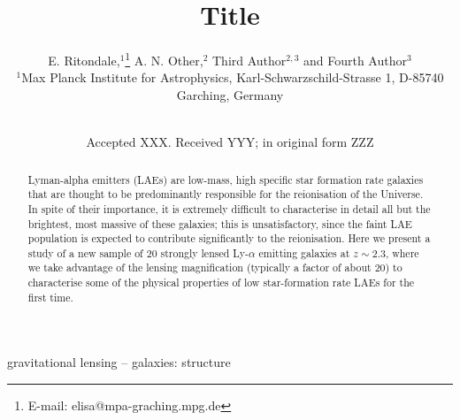 \documentclass[a4paper,fleqn,usenatbib]{mnras}
\title[Short title]{Title}
\author[E. Ritondale et al.]{
E. Ritondale,$^{1}$\thanks{E-mail: elisa@mpa-graching.mpg.de}
A. N. Other,$^{2}$
Third Author$^{2,3}$
and Fourth Author$^{3}$
\\
$^{1}$Max Planck Institute for Astrophysics, Karl-Schwarzschild-Strasse 1, D-85740 Garching, Germany\\\\
}
\date{Accepted XXX. Received YYY; in original form ZZZ}
\begin{document}
\label{firstpage}
\pagerange{\pageref{firstpage}--\pageref{lastpage}}
\maketitle

\label{firstpage}

\begin{abstract}
Lyman-alpha emitters (LAEs) are low-mass, high specific star formation rate galaxies that are thought to be predominantly responsible for the reionisation of the Universe. In spite of their importance, it is extremely difficult to characterise in detail all but the brightest, most massive of these galaxies; this is unsatisfactory, since the faint LAE population is expected to contribute significantly to the reionisation. Here we present a study of a new sample of 20 strongly lensed Ly-$\alpha$ emitting galaxies at $z \sim 2.3$, where we take advantage of the lensing magnification (typically a factor of  about 20) to characterise some of the physical properties of low star-formation rate LAEs for the first time.

\end{abstract}
\begin{keywords}
gravitational lensing -- galaxies: structure 
\end{keywords}
\end{document}
